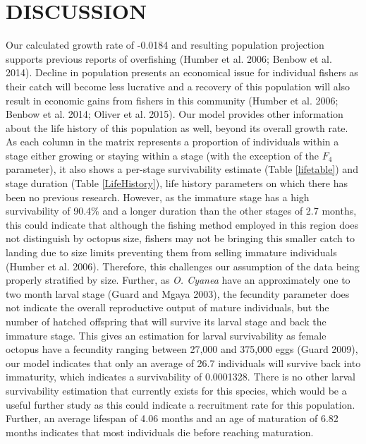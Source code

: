 \documentclass[
]{article}
\begin{document}
\hypertarget{discussion}{%
\section{DISCUSSION}\label{discussion}}

Our calculated growth rate of -0.0184 and resulting population projection supports previous reports of overfishing (Humber et al. 2006; Benbow et al. 2014). Decline in population presents an economical issue for individual fishers as their catch will become less lucrative and a recovery of this population will also result in economic gains from fishers in this community (Humber et al. 2006; Benbow et al. 2014; Oliver et al. 2015). Our model provides other information about the life history of this population as well, beyond its overall growth rate. As each column in the matrix represents a proportion of individuals within a stage either growing or staying within a stage (with the exception of the \(F_4\) parameter), it also shows a per-stage survivability estimate (Table \ref{lifetable}) and stage duration (Table \ref{LifeHistory}), life history parameters on which there has been no previous research. However, as the immature stage has a high survivability of 90.4\% and a longer duration than the other stages of 2.7 months, this could indicate that although the fishing method employed in this region does not distinguish by octopus size, fishers may not be bringing this smaller catch to landing due to size limits preventing them from selling immature individuals (Humber et al. 2006). Therefore, this challenges our assumption of the data being properly stratified by size. Further, as \emph{O. Cyanea} have an approximately one to two month larval stage (Guard and Mgaya 2003), the fecundity parameter does not indicate the overall reproductive output of mature individuals, but the number of hatched offspring that will survive its larval stage and back the immature stage. This gives an estimation for larval survivability as female octopus have a fecundity ranging between 27,000 and 375,000 eggs (Guard 2009), our model indicates that only an average of 26.7 individuals will survive back into immaturity, which indicates a survivability of 0.0001328. There is no other larval survivability estimation that currently exists for this species, which would be a useful further study as this could indicate a recruitment rate for this population. Further, an average lifespan of 4.06 months and an age of maturation of 6.82 months indicates that most individuals die before reaching maturation.
\end{document}
